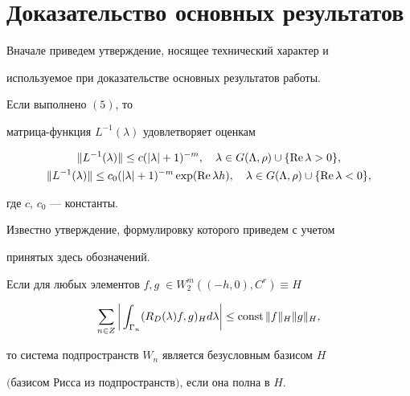 \section{Доказательство основных результатов}





Вначале приведем утверждение, носящее технический характер и


используемое при доказательстве основных результатов работы.





\begin{prop}


Если выполнено $(5)$, то


матрица-функция $L^{-1}(\lambda)$ удовлетворяет оценкам


\begin{gather*}


\|L^{-1}(\lambda)\|\le c(|\lambda|+1)^{-m},\quad


\lambda\in G(\Lambda,\rho)\cup\{\re\lambda>0\},\\


%


\|L^{-1}(\lambda)\|\le c_0(|\lambda|+1)^{-m}\exp(\re\lambda h),\quad


\lambda\in G(\Lambda,\rho)\cup\{\re\lambda<0\},


\end{gather*}


где $c$, $c_0$ --- константы.


\end{prop}





Известно утверждение, формулировку которого приведем с учетом


принятых здесь обозначений.





\begin{lem}


Если для любых элементов $f,g\;\in


W_2^m((-h,0),C^r)\equiv H$


\begin{equation}


\label{l}


\sum\limits_{n\in Z}\bigg|\int_{\Gamma_n}(R_D(\lambda)f,g)_Hd\lambda\bigg|


\le \const\|f\|_H \|g\|_H,


\end{equation}


то система подпространств $W_n$ является безусловным базисом $H$


$($базисом Рисса из под\-про\-ст\-ранств$)$, если она полна в $H$.


\end{lem}





